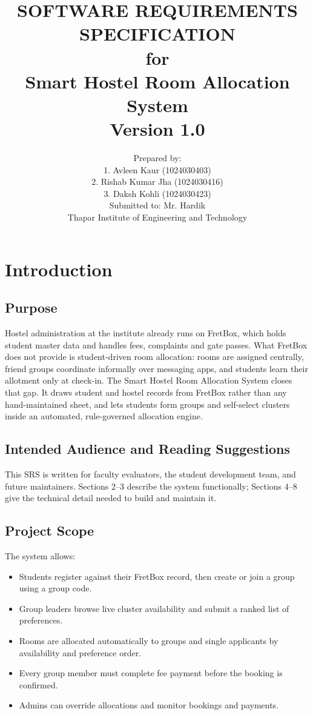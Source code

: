 \documentclass[11pt]{report}
\title{
    \vspace{2cm}
    \textbf{\Large SOFTWARE REQUIREMENTS SPECIFICATION}\\[0.5cm]
    for\\[0.5cm]
    {\Large \textbf{Smart Hostel Room Allocation System}}\\[0.3cm]
    Version 1.0
}
\author{
    Prepared by:\\
    1. Avleen Kaur (1024030403)\\
    2. Rishab Kumar Jha (1024030416)\\
    3. Daksh Kohli (1024030423)\\[0.5cm]
    Submitted to: Mr. Hardik\\[0.3cm]
    Thapar Institute of Engineering and Technology
}
\date{}
\begin{document}
\begin{titlepage}
\maketitle
\thispagestyle{empty}
\end{titlepage}

\tableofcontents
\thispagestyle{empty}
\newpage

\chapter{Introduction}

\section{Purpose}
Hostel administration at the institute already runs on FretBox, which holds student master data and
handles fees, complaints and gate passes. What FretBox does not provide is student-driven room
allocation: rooms are assigned centrally, friend groups coordinate informally over messaging apps,
and students learn their allotment only at check-in. The Smart Hostel Room Allocation System closes
that gap. It draws student and hostel records from FretBox rather than any hand-maintained sheet, and
lets students form groups and self-select clusters inside an automated, rule-governed allocation engine.

\section{Intended Audience and Reading Suggestions}
This SRS is written for faculty evaluators, the student development team, and future maintainers.
Sections 2--3 describe the system functionally; Sections 4--8 give the technical detail needed to
build and maintain it.

\section{Project Scope}
The system allows:
\begin{itemize}[leftmargin=1.2cm]
    \item Students register against their FretBox record, then create or join a group using a group code.
    \item Group leaders browse live cluster availability and submit a ranked list of preferences.
    \item Rooms are allocated automatically to groups and single applicants by availability and preference order.
    \item Every group member must complete fee payment before the booking is confirmed.
    \item Admins can override allocations and monitor bookings and payments.
\end{itemize}
\end{document}
